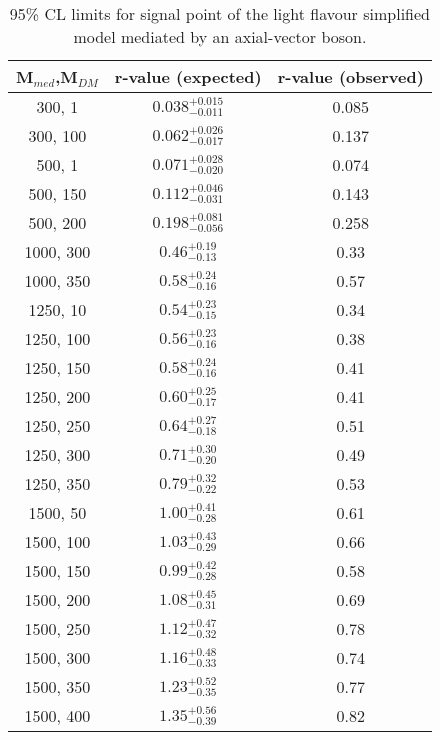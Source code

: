 \begin{table}[h!]
    \caption{%
    95\% CL limits for signal point of the light flavour simplified model 
    mediated by an axial-vector boson. }
    \label{tab:DMAV_limits}
    \centering
    \begin{tabular}{ ccc }
        \hline\hline
        M$_{med}$,M$_{DM}$ & r-value (expected) & r-value (observed) \\ 
        \hline
        300, 1    & $0.038_{-0.011}^{+0.015}$ & 0.085 \\
        300, 100  & $0.062_{-0.017}^{+0.026}$ & 0.137 \\
        500, 1    & $0.071_{-0.020}^{+0.028}$ & 0.074 \\
        500, 150  & $0.112_{-0.031}^{+0.046}$ & 0.143 \\
        500, 200  & $0.198_{-0.056}^{+0.081}$ & 0.258 \\
        1000, 300 & $0.46_{-0.13}^{+0.19}$    & 0.33  \\
        1000, 350 & $0.58_{-0.16}^{+0.24}$    & 0.57  \\
        1250, 10  & $0.54_{-0.15}^{+0.23}$    & 0.34  \\
        1250, 100 & $0.56_{-0.16}^{+0.23}$    & 0.38  \\
        1250, 150 & $0.58_{-0.16}^{+0.24}$    & 0.41  \\
        1250, 200 & $0.60_{-0.17}^{+0.25}$    & 0.41  \\
        1250, 250 & $0.64_{-0.18}^{+0.27}$    & 0.51  \\
        1250, 300 & $0.71_{-0.20}^{+0.30}$    & 0.49  \\
        1250, 350 & $0.79_{-0.22}^{+0.32}$    & 0.53  \\
        1500, 50  & $1.00_{-0.28}^{+0.41}$    & 0.61  \\
        1500, 100 & $1.03_{-0.29}^{+0.43}$    & 0.66  \\
        1500, 150 & $0.99_{-0.28}^{+0.42}$    & 0.58  \\
        1500, 200 & $1.08_{-0.31}^{+0.45}$    & 0.69  \\
        1500, 250 & $1.12_{-0.32}^{+0.47}$    & 0.78  \\
        1500, 300 & $1.16_{-0.33}^{+0.48}$    & 0.74  \\
        1500, 350 & $1.23_{-0.35}^{+0.52}$    & 0.77  \\
        1500, 400 & $1.35_{-0.39}^{+0.56}$    & 0.82  \\
        \hline\hline
    \end{tabular}
\end{table}

